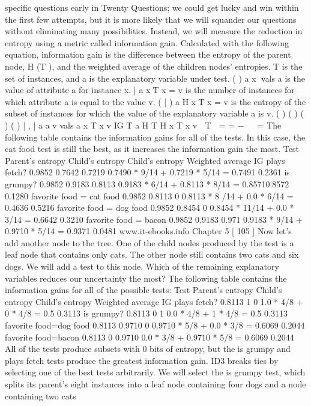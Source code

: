 specific questions early in Twenty Questions; we could get lucky and win within
the first few attempts, but it is more likely that we will squander our questions
without eliminating many possibilities. Instead, we will measure the reduction
in entropy using a metric called information gain. Calculated with the following
equation, information gain is the difference between the entropy of the parent
node, H (T ), and the weighted average of the children nodes' entropies. T is
the set of instances, and a is the explanatory variable under test. ( ) a x vals a
is the value of attribute a for instance x. { | } a xT x = v is the number
of instances for which attribute a is equal to the value v. ({ | }) a H xT x = v
is the entropy of the subset of instances for which the value of the explanatory
variable a is v.
( ) ( ) { }
( )
({ }) |
, | a
a
v vals a
x T x v
IG T a H T H x T x v
 T
 =
= −   =
The following table contains the information gains for all of the tests. In this case, the
cat food test is still the best, as it increases the information gain the most.
Test Parent's
entropy
Child's
entropy
Child's
entropy Weighted average IG
plays fetch? 0.9852 0.7642 0.7219 0.7490 * 9/14 + 0.7219 * 5/14
= 0.7491 0.2361
is grumpy? 0.9852 0.9183 0.8113 0.9183 * 6/14 + 0.8113 * 8/14
= 0.85710.8572 0.1280
favorite food =
cat food 0.9852 0.8113 0 0.8113 * 8 /14 + 0.0 * 6/14 =
0.4636 0.5216
favorite food =
dog food 0.9852 0.8454 0 0.8454 * 11/14 + 0.0 * 3/14 =
0.6642 0.3210
favorite food =
bacon 0.9852 0.9183 0.971 0.9183 * 9/14 + 0.9710 * 5/14
= 0.9371 0.0481
www.it-ebooks.info
Chapter 5
[ 105 ]
Now let's add another node to the tree. One of the child nodes produced by the test
is a leaf node that contains only cats. The other node still contains two cats and six
dogs. We will add a test to this node. Which of the remaining explanatory variables
reduces our uncertainty the most? The following table contains the information gains
for all of the possible tests:
Test Parent's
entropy
Child's
entropy
Child's
entropy Weighted average IG
plays fetch? 0.8113 1 0 1.0 * 4/8 + 0 * 4/8 = 0.5 0.3113
is grumpy? 0.8113 0 1 0.0 * 4/8 + 1 * 4/8 = 0.5 0.3113
favorite
food=dog food 0.8113 0.9710 0 0.9710 * 5/8 + 0.0 * 3/8
= 0.6069 0.2044
favorite
food=bacon 0.8113 0 0.9710 0.0 * 3/8 + 0.9710 * 5/8
= 0.6069 0.2044
All of the tests produce subsets with 0 bits of entropy, but the is grumpy and plays
fetch tests produce the greatest information gain. ID3 breaks ties by selecting one of
the best tests arbitrarily. We will select the is grumpy test, which splits its parent's
eight instances into a leaf node containing four dogs and a node containing two cats
